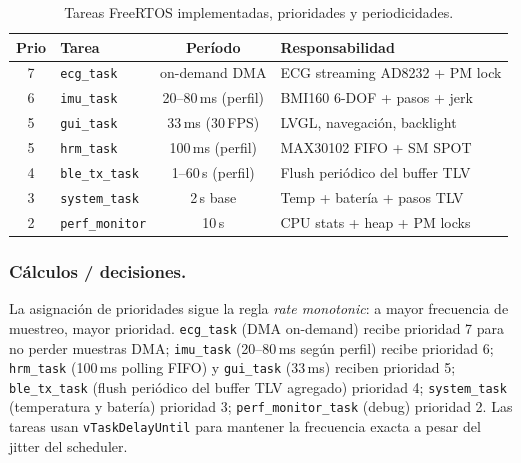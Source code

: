 \documentclass[letterpaper,11pt]{article}
\begin{document}
\begin{table}[H]
    \centering
    \caption{Tareas FreeRTOS implementadas, prioridades y periodicidades.}
    \label{tab:tasks}
    \footnotesize
    \begin{tabular}{|c|l|c|l|}
    \hline
    \rowcolor{gray!20}\textbf{Prio} & \textbf{Tarea} & \textbf{Período} & \textbf{Responsabilidad} \\\hline
    7 & \texttt{ecg\_task}       & on-demand DMA      & ECG streaming AD8232 + PM lock \\\hline
    6 & \texttt{imu\_task}       & 20--80\,ms (perfil) & BMI160 6-DOF + pasos + jerk \\\hline
    5 & \texttt{gui\_task}       & 33\,ms (30\,FPS)    & LVGL, navegación, backlight \\\hline
    5 & \texttt{hrm\_task}       & 100\,ms (perfil)    & MAX30102 FIFO + SM SPOT \\\hline
    4 & \texttt{ble\_tx\_task}   & 1--60\,s (perfil)   & Flush periódico del buffer TLV \\\hline
    3 & \texttt{system\_task}    & 2\,s base           & Temp + batería + pasos TLV \\\hline
    2 & \texttt{perf\_monitor}   & 10\,s               & CPU stats + heap + PM locks \\\hline
    \end{tabular}
\end{table}

\subsubsection{Cálculos / decisiones.} La asignación de prioridades sigue la regla \textit{rate
monotonic}: a mayor frecuencia de muestreo, mayor prioridad. \texttt{ecg\_task} (DMA
on-demand) recibe prioridad 7 para no perder muestras DMA;
\texttt{imu\_task} (20--80\,ms según perfil) recibe prioridad 6; \texttt{hrm\_task} (100\,ms polling FIFO) y
\texttt{gui\_task} (33\,ms) reciben prioridad 5; \texttt{ble\_tx\_task} (flush periódico
del buffer TLV agregado) prioridad 4; \texttt{system\_task} (temperatura y batería) prioridad 3;
\texttt{perf\_monitor\_task} (debug) prioridad 2.
Las tareas usan \texttt{vTaskDelayUntil} para mantener la frecuencia exacta a pesar del
jitter del scheduler.
\end{document}
